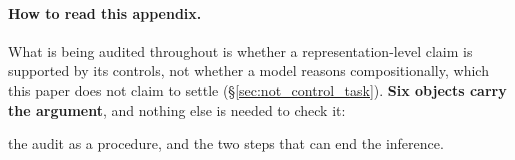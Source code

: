 \paragraph{How to read this appendix.} What is being audited throughout is whether a representation-level claim is supported by its controls, not whether a model reasons compositionally, which this paper does not claim to settle (\S\ref{sec:not_control_task}). \textbf{Six objects carry the argument}, and nothing else is needed to check it:

\begin{description}[nosep, leftmargin=1.2em]
\item[Figure~\ref{fig:audit}] the audit as a procedure, and the two steps that can end the inference.

\end{description}
